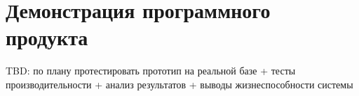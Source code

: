 \section{Демонстрация программного продукта}
TBD: по плану протестировать прототип на реальной базе + тесты производительности + анализ результатов + выводы жизнеспособности системы
